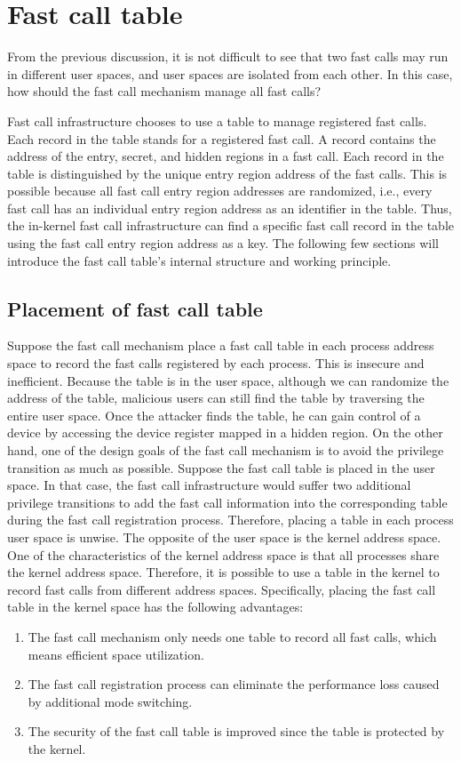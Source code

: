 \section{Fast call table}
From the previous discussion, it is not difficult to see that two fast calls may run in different user spaces, and user spaces are isolated from each other. 
In this case, how should the fast call mechanism manage all fast calls? 

Fast call infrastructure chooses to use a table to manage registered fast calls. Each record in the table stands for a registered fast call.  
A record contains the address of the entry, secret, and hidden regions in a fast call.
Each record in the table is distinguished by the unique entry region address of the fast calls. 
This is possible because all fast call entry region addresses are randomized, i.e., every fast call 
has an individual entry region address as an identifier in the table. Thus, the in-kernel fast call 
infrastructure can find a specific fast call record in the table using the fast call entry region address as a key. 
The following few sections will introduce the fast call table’s internal structure and working principle.


\subsection{Placement of fast call table}
Suppose the fast call mechanism place a fast call table in each process address space to record 
the fast calls registered by each process. This is insecure and inefficient. Because the table is 
in the user space,  although we can randomize the address of the table, malicious users can still 
find the table by traversing the entire user space. Once the attacker finds the table,  
he can gain control of a device by accessing the device register mapped in a hidden region. 
On the other hand, one of the design goals of the fast call mechanism is to avoid the privilege 
transition as much as possible. Suppose the fast call table is placed in the user space. 
In that case, the fast call infrastructure would suffer two additional privilege transitions to 
add the fast call information into the corresponding table during the fast call registration process. 
Therefore, placing a table in each process user space is unwise.
The opposite of the user space is the kernel address space. One of the characteristics of the kernel address 
space is that all processes share the kernel address space. Therefore, it is possible to use a table in the 
kernel to record fast calls from different address spaces.
Specifically, placing the fast call table in the kernel space has the following advantages:
\begin{enumerate}
  \item The fast call mechanism only needs one table to record all fast calls, which means efficient space utilization.
  \item The fast call registration process can eliminate the performance loss caused by additional mode switching.
  \item The security of the fast call table is improved since the table is protected by the kernel.
\end{enumerate}

